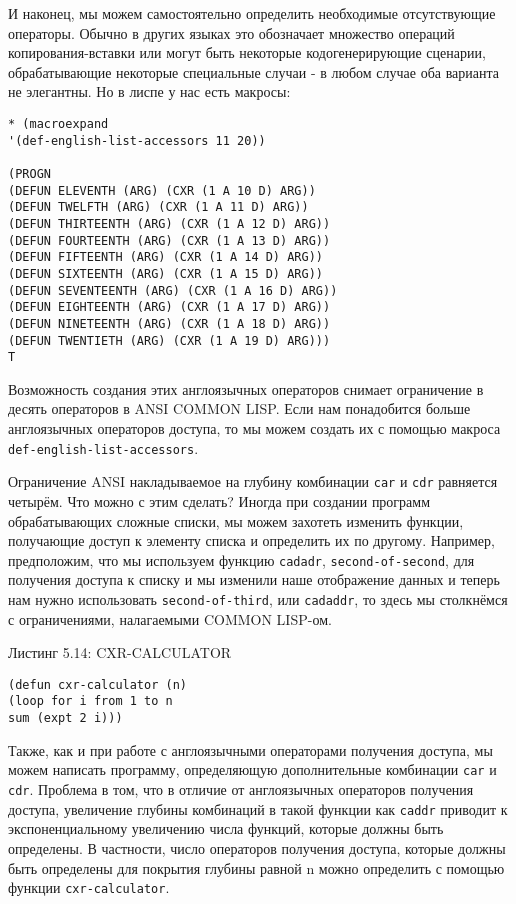 И наконец, мы можем самостоятельно определить необходимые отсутствующие операторы. Обычно в других языках это обозначает множество операций копирования-вставки или могут быть некоторые кодогенерирующие сценарии, обрабатывающие некоторые специальные случаи - в любом случае оба варианта не элегантны. Но в лиспе у нас есть макросы:

\begin{verbatim}
* (macroexpand
'(def-english-list-accessors 11 20))

(PROGN
(DEFUN ELEVENTH (ARG) (CXR (1 A 10 D) ARG))
(DEFUN TWELFTH (ARG) (CXR (1 A 11 D) ARG))
(DEFUN THIRTEENTH (ARG) (CXR (1 A 12 D) ARG))
(DEFUN FOURTEENTH (ARG) (CXR (1 A 13 D) ARG))
(DEFUN FIFTEENTH (ARG) (CXR (1 A 14 D) ARG))
(DEFUN SIXTEENTH (ARG) (CXR (1 A 15 D) ARG))
(DEFUN SEVENTEENTH (ARG) (CXR (1 A 16 D) ARG))
(DEFUN EIGHTEENTH (ARG) (CXR (1 A 17 D) ARG))
(DEFUN NINETEENTH (ARG) (CXR (1 A 18 D) ARG))
(DEFUN TWENTIETH (ARG) (CXR (1 A 19 D) ARG)))
T
\end{verbatim}

Возможность создания этих англоязычных операторов снимает ограничение в десять операторов в ANSI COMMON LISP. Если нам понадобится больше англоязычных операторов доступа, то мы можем создать их с помощью макроса \verb|def-english-list-accessors|.

Ограничение ANSI накладываемое на глубину комбинации \verb|car| и \verb|cdr| равняется четырём. Что можно с этим сделать? Иногда при создании программ обрабатывающих сложные списки, мы можем захотеть изменить функции, получающие доступ к элементу списка и определить их по другому. Например, предположим, что мы используем функцию \verb|cadadr|, \verb|second-of-second|, для получения доступа к списку и мы изменили наше отображение данных и теперь нам нужно использовать \verb|second-of-third|, или \verb|cadaddr|, то здесь мы столкнёмся с ограничениями, налагаемыми COMMON LISP-ом.

Листинг 5.14: CXR-CALCULATOR\label{listing_5.14}
\listbegin
\begin{verbatim}
(defun cxr-calculator (n)
(loop for i from 1 to n
sum (expt 2 i)))
\end{verbatim}
\listend

Также, как и при работе с англоязычными операторами получения доступа, мы можем написать программу, определяющую дополнительные комбинации \verb|car| и \verb|cdr|. Проблема в том, что в отличие от англоязычных операторов получения доступа, увеличение глубины комбинаций в такой функции как \verb|caddr| приводит к экспоненциальному увеличению числа функций, которые должны быть определены. В частности, число операторов получения доступа, которые должны быть определены для покрытия глубины равной n можно определить с помощью функции \verb|cxr-calculator|.

